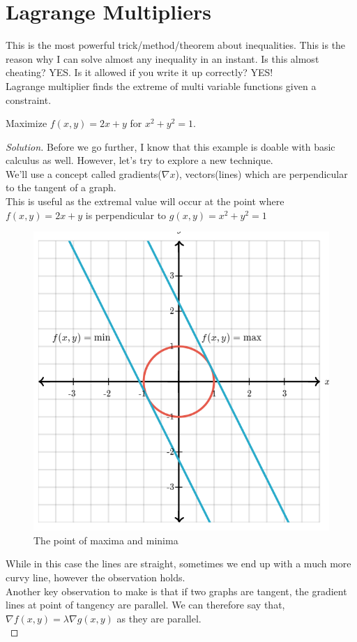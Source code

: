 \section{Lagrange Multipliers}
This is the most powerful trick/method/theorem about inequalities. This is the reason why I can solve almost any inequality in an instant. Is this almost cheating? YES. Is it allowed if you write it up correctly? YES!\\
Lagrange multiplier finds the extreme of multi variable functions given a constraint.\\
\begin{example}
    Maximize $f(x,y)=2x+y$ for $x^2+y^2=1$. 
\end{example}
\begin{proof}
    [Solution]
    Before we go further, I know that this example is doable with basic calculus as well. However, let's try to explore a new technique.\\
    We'll use a concept called gradients($\nabla x$), vectors(lines) which are perpendicular to the tangent of a graph.\\
    This is useful as the extremal value will occur at the point where $f(x,y)=2x+y$ is perpendicular to $g(x,y)=x^2+y^2=1$\\
    \begin{figure} [h]
        \centering
        \includegraphics[width=0.5\linewidth]{Photos/Gradient Lagrange.png}
        \caption{The point of maxima and minima}
    \end{figure}
    While in this case the lines are straight, sometimes we end up with a much more curvy line, however the observation holds.\\
    Another key observation to make is that if two graphs are tangent, the gradient lines at point of tangency are parallel. We can therefore say that, $\nabla f(x,y)= \lambda \nabla g(x,y)$ as they are parallel.\\

\end{proof}

